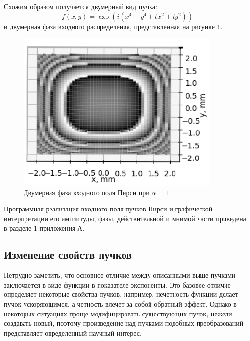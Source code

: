 {{\begin{figure}[H]
\end{figure}

Схожим образом получается двумерный вид пучка:
\begin{equation*}
	f(x, y)  = \exp(i(x^4 + y^4 + tx^2 + ty^2))
\end{equation*}
и двумерная фаза входного распределения, представленная на рисунке \ref{pearcey_phase_2d}.
 \begin{figure}[H]
		  \begin{center}
			\includegraphics[width=10cm]{plots/pearcey_phase_2d_ortho}
	\caption{Двумерная фаза входного поля Пирси при $\alpha  = 1$}
	\label{pearcey_phase_2d}
		 \end{center}
	
\end{figure}

	Программная реализация входного поля пучков Пирси и графической
интерпретации его амплитуды, фазы, действительной и мнимой части
приведена в разделе 1 приложения А.
}
\subsection{Изменение свойств пучков}{
	Нетрудно заметить, что основное отличие между описанными выше пучками заключается в виде функции в показателе экспоненты. Это базовое отличие определяет некоторые свойства пучков, например, нечетность функции делает пучок ускоряющимся, а четность влечет за собой обратный эффект. Однако в некоторых ситуациях проще модифицировать существующих пучок, нежели создавать новый, поэтому произведение над пучками подобных преобразований представляет определенный научный интерес.
	
}}

